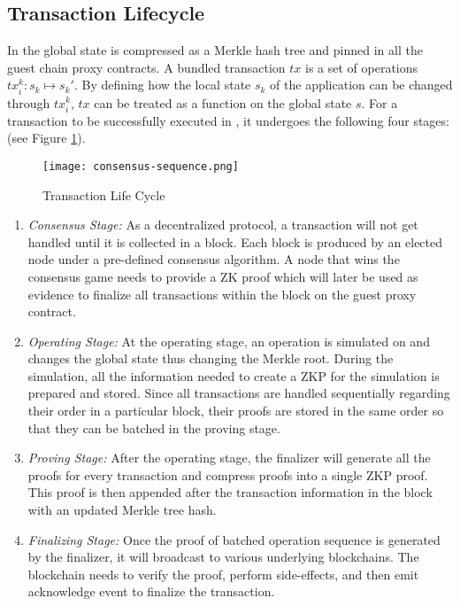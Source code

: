 \subsection{Transaction Lifecycle}
In \dprotocol the global state is compressed as a Merkle hash tree and pinned in all the guest chain proxy contracts. A bundled transaction $tx$ is a set of operations $tx_i^k: s_k \mapsto s_k'$. By defining how the local state $s_k$ of the application can be changed through $tx_i^k$, $tx$ can be treated as a function on the global state $s$. For a transaction to be successfully executed in \dprotocol, it undergoes the following four stages: (see Figure \ref{transaction-fifecycle}).
\begin{figure}[!ht]
\texttt{[image: consensus-sequence.png]}
\caption{Transaction Life Cycle}
\label{transaction-fifecycle}
\end{figure}
\begin{enumerate}[leftmargin=*]
\item \emph{Consensus Stage:} As a decentralized protocol, a transaction will not get handled until it is collected in a block. Each block is produced by an elected node under a pre-defined consensus algorithm. A node that wins the consensus game needs to provide a ZK proof which will later be used as evidence to finalize all transactions within the block on the guest proxy contract.

\item \emph{Operating Stage:} At the operating stage, an operation is simulated on \dprotocol and changes the global state thus changing the Merkle root. During the simulation, all the information needed to create a ZKP for the simulation is prepared and stored. Since all transactions are handled sequentially regarding their order in a particular block, their proofs are stored in the same order so that they can be batched in the proving stage. 

\item \emph{Proving Stage:} After the operating stage, the finalizer will generate all the proofs for every transaction and compress proofs into a single ZKP proof. This proof is then appended after the transaction information in the block with an updated Merkle tree hash. 
\item \emph{Finalizing Stage:} Once the proof of batched operation sequence is generated by the finalizer, it will broadcast to various underlying blockchains. The blockchain needs to verify the proof, perform side-effects, and then emit acknowledge event to finalize the transaction.
\end{enumerate}

